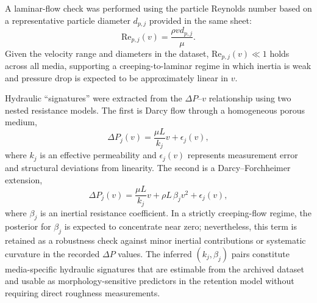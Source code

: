 \documentclass[12pt,a4paper]{article}
\begin{document}
A laminar-flow check was performed using the particle Reynolds number based on a representative particle diameter $d_{p,j}$ provided in the same sheet:
\begin{equation}
\mathrm{Re}_{p,j}(v)=\frac{\rho v d_{p,j}}{\mu}.
\end{equation}
Given the velocity range and diameters in the dataset, $\mathrm{Re}_{p,j}(v)\ll 1$ holds across all media, supporting a creeping-to-laminar regime in which inertia is weak and pressure drop is expected to be approximately linear in $v$.

Hydraulic ``signatures'' were extracted from the $\Delta P$--$v$ relationship using two nested resistance models. The first is Darcy flow through a homogeneous porous medium,
\begin{equation}
\Delta P_{j}(v)=\frac{\mu L}{k_j}v + \epsilon_{j}(v),
\end{equation}
where $k_j$ is an effective permeability and $\epsilon_j(v)$ represents measurement error and structural deviations from linearity. The second is a Darcy--Forchheimer extension,
\begin{equation}
\Delta P_{j}(v)=\frac{\mu L}{k_j}v + \rho L\,\beta_j v^2 + \epsilon_{j}(v),
\end{equation}
where $\beta_j$ is an inertial resistance coefficient. In a strictly creeping-flow regime, the posterior for $\beta_j$ is expected to concentrate near zero; nevertheless, this term is retained as a robustness check against minor inertial contributions or systematic curvature in the recorded $\Delta P$ values. The inferred $(k_j,\beta_j)$ pairs constitute media-specific hydraulic signatures that are estimable from the archived dataset and usable as morphology-sensitive predictors in the retention model without requiring direct roughness measurements.
\end{document}
